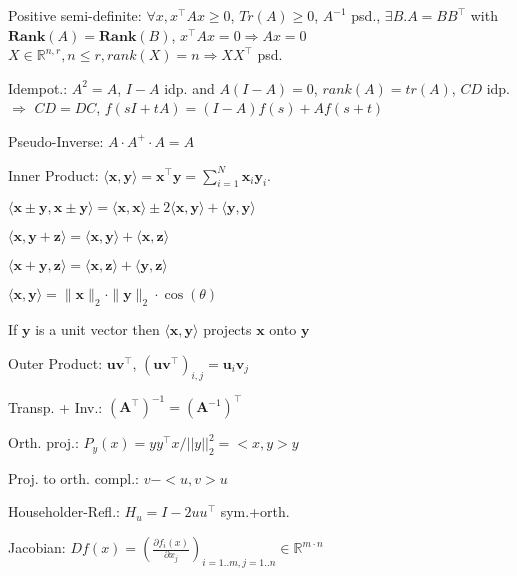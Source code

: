 \begin{compactdesc}
	\item[Positive semi-definite:] $\forall x, x^\top A x \geq 0$, $Tr(A)\geq 0$, $A^{-1}$ psd., $\exists B . A=BB^\top$ with $\mathbf{Rank}(A)=\mathbf{Rank}(B)$, $x^\top A x = 0 \Rightarrow A x = 0$ $X\in \mathbb{R}^{n,r}, n\leq r, rank(X)=n \Rightarrow XX^\top$ psd.
	\item[Idempot.:] $A^2 = A$, $I-A$ idp. and $A(I-A)=0$, $rank(A)=tr(A)$, $CD$ idp. $\Rightarrow$ $CD=DC$, $f(sI+tA)=(I-A)f(s)+A f(s+t)$
	\item[Pseudo-Inverse:] $A\cdot A^+\cdot A = A$
	\item[Inner Product:] $\langle \mathbf{x}, \mathbf{y} \rangle = \mathbf{x}^\top \mathbf{y} = \sum_{i=1}^{N} \mathbf{x}_i \mathbf{y}_i$.
	\begin{inparaitem}
		\item $\langle \mathbf{x} \pm \mathbf{y}, \mathbf{x} \pm \mathbf{y} \rangle = \langle \mathbf{x}, \mathbf{x} \rangle \pm 2 \langle \mathbf{x}, \mathbf{y} \rangle + \langle \mathbf{y}, \mathbf{y} \rangle$
		\item $\langle \mathbf{x}, \mathbf{y} + \mathbf{z} \rangle = \langle \mathbf{x}, \mathbf{y} \rangle + \langle \mathbf{x}, \mathbf{z} \rangle$
		\item $\langle \mathbf{x} + \mathbf{y}, \mathbf{z} \rangle = \langle \mathbf{x}, \mathbf{z} \rangle + \langle \mathbf{y}, \mathbf{z} \rangle$
		\item $\langle \mathbf{x}, \mathbf{y} \rangle = \|\mathbf{x}\|_2 \cdot \|\mathbf{y}\|_2 \cdot \cos(\theta)$
		\item If $\mathbf{y}$ is a unit vector then $\langle \mathbf{x}, \mathbf{y} \rangle$ projects $\mathbf{x}$ onto $\mathbf{y}$
	\end{inparaitem}
	\item[Outer Product:] $\mathbf{u} \mathbf{v}^\top$, $(\mathbf{u} \mathbf{v}^\top)_{i, j} = \mathbf{u}_i \mathbf{v}_j$
	\item[Transp. + Inv.:] $(\mathbf{A}^\top)^{-1} = (\mathbf{A}^{-1})^\top$
	\item[Orth. proj.:] $P_y(x)=y y^\top x / ||y||^2_2 = <x,y>y$
	\item[Proj. to orth. compl.:] $v-<u,v>u$
	\item[Householder-Refl.:] $H_u=I-2uu^\top$ sym.+orth.
	\item[Jacobian:] $D f(x)=(\frac{\partial f_i(x)}{\partial x_j})_{i=1..m, j=1..n} \in \mathbb{R}^{m\cdot n}$
\end{compactdesc}

